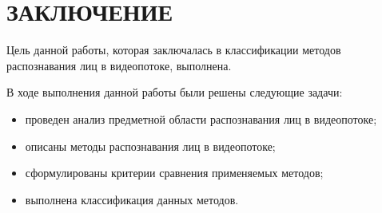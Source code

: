 \chapter*{ЗАКЛЮЧЕНИЕ}


Цель данной работы, которая заключалась в классификации методов распознавания лиц в 
видеопотоке, выполнена. 

В ходе выполнения данной работы были решены следующие задачи:
\begin{itemize}[label=---]
  \item проведен анализ предметной области распознавания лиц в видеопотоке;
  \item описаны методы распознавания лиц в видеопотоке;
  \item сформулированы критерии сравнения применяемых методов;
  \item выполнена классификация данных методов.
\end{itemize}

